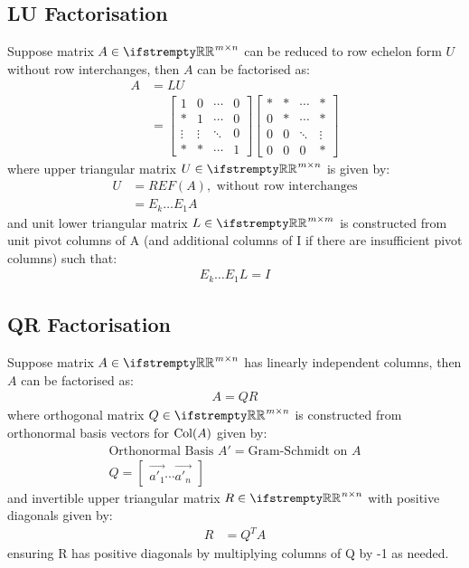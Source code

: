 \documentclass[12pt, a4paper]{article}
\begin{document}
\begin{multicols*}{3}
\subsection{LU Factorisation}
Suppose matrix $A \in \RR^{m{\times}n}$ can be reduced to row echelon form $U$ without row interchanges, then $A$ can be factorised as:
\begin{align*}
  A &= LU \\
    &= \begin{bmatrix}1 & 0 & \cdots & 0 \\ * & 1 & \cdots & 0 \\ \vdots & \vdots & \ddots & 0 \\ * & * & \cdots & 1\end{bmatrix}
       \begin{bmatrix}* & * & \cdots & * \\ 0 & * & \cdots & * \\ 0 & 0 & \ddots & \vdots \\ 0 & 0 & 0 & *\end{bmatrix}
\end{align*}
where upper triangular matrix $U \in \RR^{m{\times}n}$ is given by:
\begin{align*}
  U &= REF(A), \text{ without row interchanges} \\
    &= E_k{\ldots}E_1A
\end{align*}
and unit lower triangular matrix $L \in \RR^{m{\times}m}$ is constructed from unit pivot columns of A (and additional columns of I if there are insufficient pivot columns) such that:
\begin{align*}
  E_k{\ldots}E_1L = I
\end{align*}

\subsection{QR Factorisation}
Suppose matrix $A \in \RR^{m{\times}n}$ has linearly independent columns, then $A$ can be factorised as:
\begin{align*}
  A = QR
\end{align*}
where orthogonal matrix $Q \in \RR^{m{\times}n}$ is constructed from orthonormal basis vectors for $\operatorname{Col}(A)$ given by:
\begin{gather*}
  \text{Orthonormal Basis }A' = \text{Gram-Schmidt on } A \\
  Q = \begin{bmatrix}\vec{a'_1} \cdots \vec{a'_n}\end{bmatrix}
\end{gather*}
and invertible upper triangular matrix $R \in \RR^{n{\times}n}$ with positive diagonals given by:
\begin{align*}
  R &= Q^TA
\end{align*}
ensuring R has positive diagonals by multiplying columns of Q by -1 as needed.


\end{multicols*}
\end{document}
